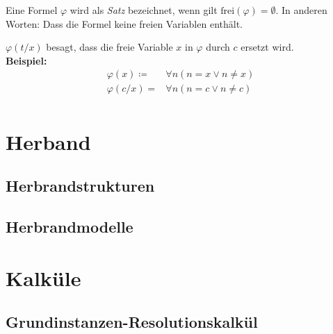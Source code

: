 \begin{description}
            \item[Sätze] Eine Formel $ \varphi $ wird als \textit{Satz} bezeichnet, wenn gilt $ \text{frei}(\varphi) = \emptyset $. In anderen Worten: Dass die Formel keine freien Variablen enthält.
            \item $ \varphi(t / x) $ besagt, dass die freie Variable $ x $ in $ \varphi $ durch $ c $ ersetzt wird. \\
                \textbf{Beispiel:}
                \begin{align*}
                    \varphi(x) \coloneqq& \forall n (n = x \lor n \neq x) \\
                    \varphi(c / x) =& \forall n (n = c \lor n \neq c) \\
                \end{align*}
        \end{description}

    \section{Herband}
        \subsection{Herbrandstrukturen}

        \subsection{Herbrandmodelle}

    \section{Kalküle}
        \subsection{Grundinstanzen-Resolutionskalkül}

